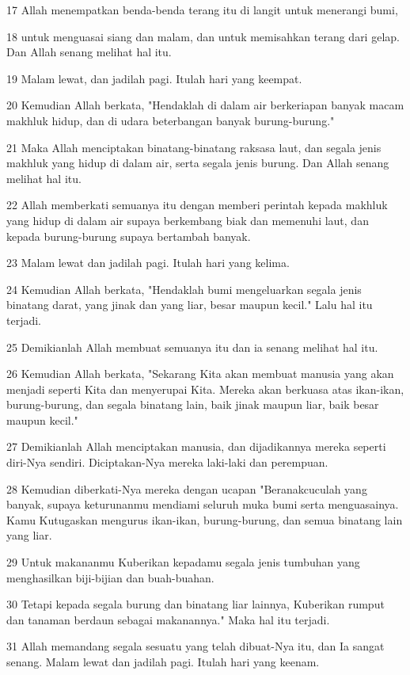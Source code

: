 \par 17 Allah menempatkan benda-benda terang itu di langit untuk menerangi bumi,
\par 18 untuk menguasai siang dan malam, dan untuk memisahkan terang dari gelap. Dan Allah senang melihat hal itu.
\par 19 Malam lewat, dan jadilah pagi. Itulah hari yang keempat.
\par 20 Kemudian Allah berkata, "Hendaklah di dalam air berkeriapan banyak macam makhluk hidup, dan di udara beterbangan banyak burung-burung."
\par 21 Maka Allah menciptakan binatang-binatang raksasa laut, dan segala jenis makhluk yang hidup di dalam air, serta segala jenis burung. Dan Allah senang melihat hal itu.
\par 22 Allah memberkati semuanya itu dengan memberi perintah kepada makhluk yang hidup di dalam air supaya berkembang biak dan memenuhi laut, dan kepada burung-burung supaya bertambah banyak.
\par 23 Malam lewat dan jadilah pagi. Itulah hari yang kelima.
\par 24 Kemudian Allah berkata, "Hendaklah bumi mengeluarkan segala jenis binatang darat, yang jinak dan yang liar, besar maupun kecil." Lalu hal itu terjadi.
\par 25 Demikianlah Allah membuat semuanya itu dan ia senang melihat hal itu.
\par 26 Kemudian Allah berkata, "Sekarang Kita akan membuat manusia yang akan menjadi seperti Kita dan menyerupai Kita. Mereka akan berkuasa atas ikan-ikan, burung-burung, dan segala binatang lain, baik jinak maupun liar, baik besar maupun kecil."
\par 27 Demikianlah Allah menciptakan manusia, dan dijadikannya mereka seperti diri-Nya sendiri. Diciptakan-Nya mereka laki-laki dan perempuan.
\par 28 Kemudian diberkati-Nya mereka dengan ucapan "Beranakcuculah yang banyak, supaya keturunanmu mendiami seluruh muka bumi serta menguasainya. Kamu Kutugaskan mengurus ikan-ikan, burung-burung, dan semua binatang lain yang liar.
\par 29 Untuk makananmu Kuberikan kepadamu segala jenis tumbuhan yang menghasilkan biji-bijian dan buah-buahan.
\par 30 Tetapi kepada segala burung dan binatang liar lainnya, Kuberikan rumput dan tanaman berdaun sebagai makanannya." Maka hal itu terjadi.
\par 31 Allah memandang segala sesuatu yang telah dibuat-Nya itu, dan Ia sangat senang. Malam lewat dan jadilah pagi. Itulah hari yang keenam.

